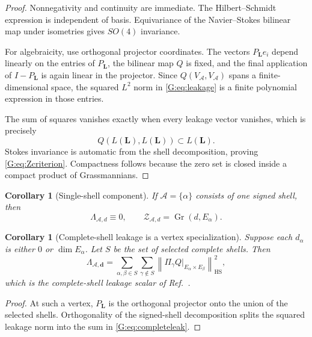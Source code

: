\documentclass[
 aps,
 prd,
 reprint,
 amsmath,
 amssymb,
 nofootinbib,
 superscriptaddress
]{revtex4-2}
\newtheorem{corollary}[theorem]{Corollary}
\theoremstyle{definition}
\theoremstyle{remark}
\newcommand{\cZ}{\mathcal Z}
\newcommand{\Gr}{\operatorname{Gr}}
\newcommand{\HS}{\mathrm{HS}}
\begin{document}
\begin{proof}
Nonnegativity and continuity are immediate.  The Hilbert--Schmidt expression
is independent of basis.  Equivariance of the Navier--Stokes bilinear map
under isometries gives $SO(4)$ invariance.

For algebraicity, use orthogonal projector coordinates.  The vectors
$P_{\mathbf L}e_i$ depend linearly on the entries of $P_{\mathbf L}$,
the bilinear map $Q$ is fixed, and the final application of
$I-P_{\mathbf L}$ is again linear in the projector.  Since
$Q(V_{\mathcal A},V_{\mathcal A})$ spans a finite-dimensional space, the
squared $L^2$ norm in \eqref{G:eq:leakage} is a finite polynomial expression in
those entries.

The sum of squares vanishes exactly when every leakage vector vanishes,
which is precisely
\[
      Q(L(\mathbf L),L(\mathbf L))
      \subset L(\mathbf L).
\]
Stokes invariance is automatic from the shell decomposition, proving
\eqref{G:eq:Zcriterion}.  Compactness follows because the zero set is closed
inside a compact product of Grassmannians.
\end{proof}

\begin{corollary}[Single-shell component]
\label{G:cor:singlecomponent}
If $\mathcal A=\{\alpha\}$ consists of one signed shell, then
\[
        \Lambda_{\mathcal A,d}\equiv0,
        \qquad
        \cZ_{\mathcal A,d}
        =
        \Gr(d,E_\alpha).
\]
\end{corollary}

\begin{corollary}[Complete-shell leakage is a vertex specialization]
\label{G:cor:vertex}
Suppose each $d_\alpha$ is either $0$ or $\dim E_\alpha$.  Let $S$ be the
set of selected complete shells.  Then
\begin{equation}
 \Lambda_{\mathcal A,\mathbf d}
 =
 \sum_{\alpha,\beta\in S}
 \sum_{\gamma\notin S}
 \left\|
 \Pi_\gamma Q
 \big|_{E_\alpha\times E_\beta}
 \right\|_{\HS}^2,
 \label{G:eq:completeleak}
\end{equation}
which is the complete-shell leakage scalar of
Ref.~\cite{BateninPreece2026}.
\end{corollary}

\begin{proof}
At such a vertex, $P_{\mathbf L}$ is the orthogonal projector onto the union
of the selected shells.  Orthogonality of the signed-shell decomposition
splits the squared leakage norm into the sum in \eqref{G:eq:completeleak}.
\end{proof}
\end{document}
